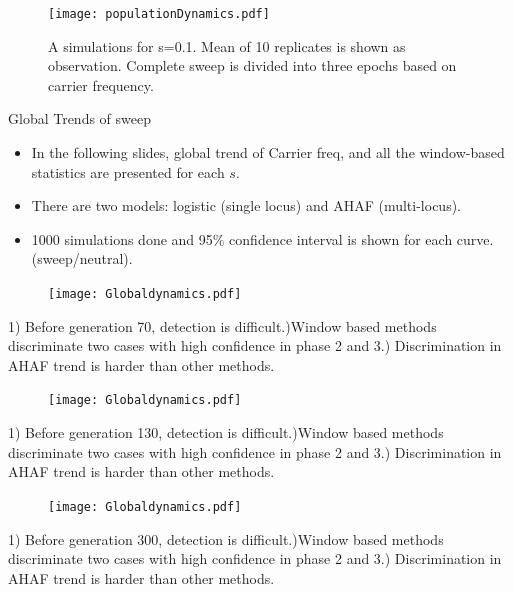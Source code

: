 \documentclass[t]{beamer} %
\begin{document}
\begin{figure}
  \centering
  		    \texttt{[image: populationDynamics.pdf]}
  \caption{A simulations for s=0.1. Mean of 10 replicates is shown as observation.
  Complete sweep is divided into three epochs based on carrier frequency.}
\end{figure}

\begin{frame}{Global Trends of sweep}
\begin{itemize}
\item In the following slides, global trend of Carrier freq, and all the window-based statistics are presented for each $s$.
\item There are two models: logistic (single locus) and AHAF (multi-locus).
\item 1000 simulations done and 95\% confidence interval is shown for each curve. (sweep/neutral).
\end{itemize}

\end{frame}

\begin{figure}[H]
  \centering
  		    \texttt{[image: Globaldynamics.pdf]}
\end{figure}
{\tiny 1) Before generation 70, detection is difficult.)Window based methods discriminate two cases with high confidence in phase 2 and 3.) Discrimination in AHAF trend is harder than other methods.}

\begin{figure}[H]
  \centering
  		    \texttt{[image: Globaldynamics.pdf]}
\end{figure}
{\tiny 1) Before generation 130, detection is difficult.)Window based methods discriminate two cases with high confidence in phase 2 and 3.) Discrimination in AHAF trend is harder than other methods.}

\begin{figure}[H]
  \centering
  		    \texttt{[image: Globaldynamics.pdf]}
\end{figure}
{\tiny 1) Before generation 300, detection is difficult.)Window based methods discriminate two cases with high confidence in phase 2 and 3.) Discrimination in AHAF trend is harder than other methods.}
\end{document}
